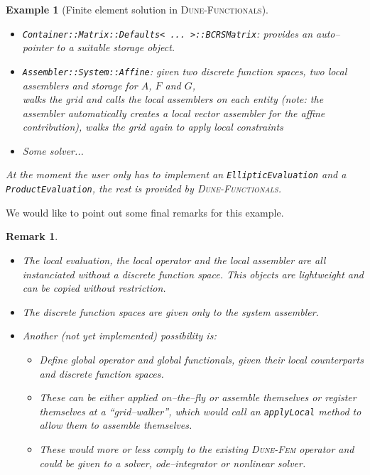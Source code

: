 \documentclass[a4paper,11pt]{article}
\numberwithin{equation}{section}
\newtheorem{remark}[definition]{Remark}
\newtheorem{example}[definition]{Example}
\newcommand{\theoremNewline}{\hspace{1mm}\\}
\newcommand{\theoremEndLine}{\hspace{1mm}}
\newcommand{\CodeT}[1]{\textnormal{\texttt{#1}}}
\newcommand{\dunefem}{\textsc{Dune-Fem}\xspace}
\newcommand{\dunefunctionals}{\textsc{Dune-Functionals}\xspace}
\begin{document}
\begin{example}[Finite element solution in \dunefunctionals]
\begin{itemize}
			$A$.
		\item \CodeT{Container::Matrix::Defaults< ... >::BCRSMatrix}: provides an auto--pointer to a suitable storage object.
		\item \CodeT{Assembler::System::Affine}: given two discrete function spaces, two local assemblers and storage for
			$A$, $F$ and $G$,\\
			walks the grid and calls the local assemblers on each entity (note: the assembler automatically creates a local
			vector assembler for the affine contribution),
			walks the grid again to apply local constraints\\
		\item Some solver...
	\end{itemize}
	At the moment the user only has to implement an \CodeT{EllipticEvaluation} and a \CodeT{ProductEvaluation}, the rest is
	provided by \dunefunctionals.  
\end{example}\theoremEndLine

We would like to point out some final remarks for this example.

\begin{remark}\theoremNewline
  \label{remarks::discretization::final_remarks_fem}
  \begin{itemize}
    \item The local evaluation, the local operator and the local assembler are all instanciated without a discrete
			function space. This objects are lightweight and can be copied without restriction.
		\item The discrete function spaces are given only to the system assembler.
		\item Another (not yet implemented) possibility is:
			\begin{itemize}
				\item Define global operator and global functionals, given their local counterparts and discrete function
					spaces.
				\item These can be either applied on--the--fly or assemble themselves or register themselves at a
					``grid--walker'', which would call an \CodeT{applyLocal} method to allow them to assemble themselves.
				\item These would more or less comply to the existing \dunefem operator and could be given to a solver,
					ode--integrator or nonlinear solver.
			\end{itemize}
	\end{itemize}
\end{remark}\theoremEndLine
  
%   
%   
\end{document}
